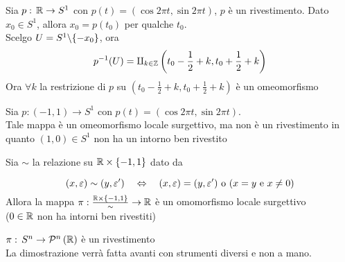 \begin{ese}Sia $p:\, \mathbb{R} \to S^1 $ con $p(t)=( \cos 2\pi t, \sin 2 \pi t)$, $p$ \`e un rivestimento.
\proof Dato $x_0 \in S^1$, allora $x_0 = p(t_0)$ per qualche $t_0$.\\
Scelgo $U= S^1\backslash \{ -x_0\}$, ora $$p^{-1}(U) = \amalg_{k \in \mathbb{Z}} \left( t_0 - \frac{1}{2}+k, t_0+\frac{1}{2}+k \right)$$
Ora $\forall k$ la restrizione di $p$ su $\left( t_0 - \frac{1}{2}+k, t_0+\frac{1}{2}+k \right)$ \`e un omeomorfismo
\end{ese}
\begin{ese} Sia $p:(-1,1) \to S^1 $ con $p(t) = ( \cos 2 \pi t , \sin 2\pi t)$.\\
Tale mappa \`e un omeomorfismo locale surgettivo, ma non \`e un rivestimento in quanto $(1,0) \in S^1 $ non ha un intorno ben rivestito
\end{ese}
\begin{ex}\bianco Sia $\sim $ la relazione su $\mathbb{R} \times \{-1,1 \}$ dato da 

$$ (x,\varepsilon) \sim (y , \varepsilon') \quad \Leftrightarrow \quad (x,\varepsilon)=(y,\varepsilon') \text{ o }( x = y \text{ e } x \neq 0 )$$
Allora la mappa $\pi: \frac{\mathbb{R} \times \{ -1 , 1\} }{\sim} \to \mathbb{R}$ \`e un omomorfismo locale surgettivo \\($0\in \mathbb{R}$ non ha intorni ben rivestiti)
\end{ex}
\begin{ex}$\pi:\, S^n \to \mathcal{P}^n \left( \mathbb{R} \right)$ \`e un rivestimento \\
La dimostrazione verr\`a fatta avanti con strumenti diversi e non a mano.
\end{ex}
\spazio
